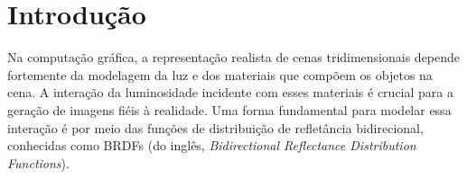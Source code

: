 \documentclass[english,
               brazil,
               bsc] %
               {dcomp-abntex2}
\begin{document}


\frenchspacing 




\pretextual








\inserirInformacoesPDF


\imprimircapa
\imprimirfolhaderosto*


% 
% 
% 

% 




\mostrarlistadeILUSTRACOES
\mostrarlistadeTABELAS
\mostrarlistadeCODIGOS
\mostrarlistadeALGORITMOS
 
% 
% 
    
\mostrarSUMARIO




\textual


\chapter{Introdução}
\label{introduction}


Na computação gráfica, a representação realista de cenas tridimensionais depende fortemente da modelagem da luz e dos materiais que compõem os objetos na cena. A interação da luminosidade incidente com esses materiais é crucial para a geração de imagens fiéis à realidade. Uma forma fundamental para modelar essa interação é por meio das funções de distribuição de refletância bidirecional, conhecidas como BRDFs (do inglês, \textit{Bidirectional Reflectance Distribution Functions}).
\end{document}
